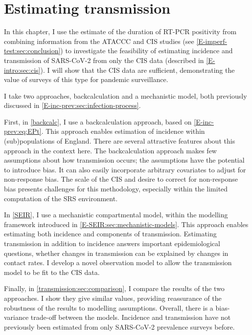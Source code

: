 \documentclass[thesis.tex]{subfiles}
\begin{document}
\ifSubfilesClassLoaded{
    \setcounter{chapter}{6}
}

\chapter{Estimating transmission} \label{transmission}

In this chapter, I use the estimate of the duration of RT-PCR positivity from combining information from the ATACCC and CIS studies (see \cref{E-imperf-test:sec:conclusion}) to investigate the feasibility of estimating incidence and transmission of SARS-CoV-2 from only the CIS data (described in \cref{E-intro:sec:cis}).
I will show that the CIS data are sufficient, demonstrating the value of surveys of this type for pandemic surveillance.

I take two approaches, backcalculation and a mechanistic model, both previously discussed in \cref{E-inc-prev:sec:infection-process}.

First, in \cref{backcalc}, I use a backcalculation approach, based on \cref{E-inc-prev:eq:EPt}.
This approach enables estimation of incidence within (sub)populations of England.
There are several attractive features about this approach in the context here.
The backcalculation approach makes few assumptions about how transmission occurs; the assumptions have the potential to introduce bias.
It can also easily incorporate arbitrary covariates to adjust for non-response bias.
The scale of the CIS and desire to correct for non-response bias presents challenges for this methodology, especially within the limited computation of the SRS environment.

In \cref{SEIR}, I use a mechanistic compartmental model, within the modelling framework introduced in \cref{E-SEIR:sec:mechanistic-models}.
This approach enables estimating both incidence and components of transmission.
Estimating transmission in addition to incidence answers important epidemiological questions, \eg whether changes in transmission can be explained by changes in contact rates.
I develop a novel observation model to allow the transmission model to be fit to the CIS data.

Finally, in \cref{transmission:sec:comparison}, I compare the results of the two approaches.
I show they give similar values, providing reassurance of the robustness of the results to modelling assumptions.
Overall, there is a bias-variance trade-off between the models.
Incidence and transmission have not previously been estimated from only SARS-CoV-2 prevalence surveys before.
\end{document}
